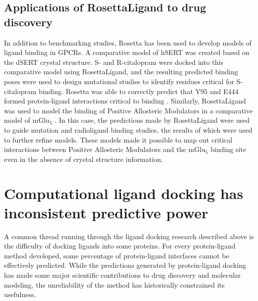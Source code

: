 \subsection{Applications of RosettaLigand to drug discovery}
In addition to benchmarking studies, Rosetta has been used to develop models of ligand binding in \ac{GPCR}s.
A comparative model of hSERT was created based on the dSERT crystal structure. 
S- and R-citalopram were docked into this comparative model using RosettaLigand, and the resulting predicted binding poses were used to design mutational studies to identify residues critical for S-citalopram binding.
Rosetta was able to correctly predict that Y95 and E444 formed protein-ligand interactions critical to binding \citep{Combs:2011db}.  
Similarly, RosettaLigand was used to model the binding of Positive Allosteric Modulators in a comparative model of mGlu$_{5}$ \citep{Turlington:2013et}.
In this case, the predictions made by RosettaLigand were used to guide mutation and radioligand binding studies, the results of which were used to further refine models.
These models made it possible to map out critical interactions between Positive Allosteric Modulators and the mGlu$_{5}$ binding site even in the absence of crystal structure information.

\section{Computational ligand docking has inconsistent predictive power} 

A common thread running through the ligand docking research described above is the difficulty of docking ligands into some proteins.
For every protein-ligand method developed, some percentage of protein-ligand interfaces cannot be effectively predicted.
While the predictions generated by protein-ligand docking has made some major scientific contributions to drug discovery and molecular modeling, the unreliability of the method has historically constrained its usefulness.

